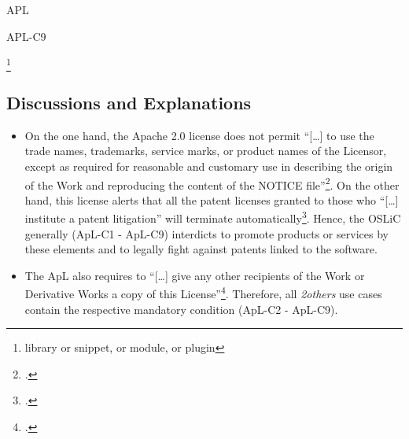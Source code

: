 \begin{license}{APL}
\begin{lsuc}{APL-C9}
\begin{lsucrequires}
    \lsucmandatory{\displayNoticeOfEmbeddedLibrary}
     
    \footnote{library or snippet, or module, or plugin} 

    \lsucoptional{\documentationBinary}
  
  \end{lsucrequires}

  \begin{lsucprohibits}
    \lsucitem{\noTrademarks}
    \lsucitem{\noPatentLitigation}
  \end{lsucprohibits}
\end{lsuc}

\subsection{Discussions and Explanations}
\label{APLDiscussion}
\begin{itemize}
  \item On the one hand, the Apache 2.0 license does not permit
  \enquote{[\ldots] to use the trade names, trademarks, service marks, or
  product names of the Licensor, except as required for reasonable and customary
  use in describing the origin of the Work and reproducing the content of the
  NOTICE file}\footcite[cf.][\nopage wp.\ §6]{Apl20OsiLicense2004a}. On the other
  hand, this license alerts that all the patent licenses granted to those who
  \enquote{[\ldots] institute a patent litigation} will terminate
  automatically\footcite[cf.][\nopage wp.\ §3]{Apl20OsiLicense2004a}. Hence, the
  OSLiC generally (ApL-C1 - ApL-C9) interdicts to promote products or services by
  these elements and to legally fight against patents linked to the software.
  
  \item The ApL also requires to \enquote{[\ldots] give any other recipients of
  the Work or Derivative Works a copy of this License}\footcite[cf.][\nopage wp.\
  §4.1]{Apl20OsiLicense2004a}. Therefore, all \emph{2others} use cases contain
  the respective mandatory condition (ApL-C2 - ApL-C9).
   

\end{itemize}
\end{license}

